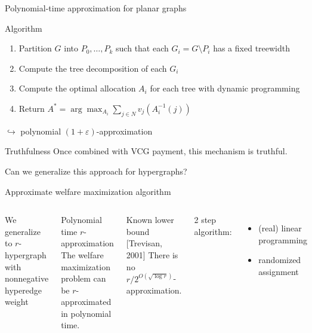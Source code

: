 \documentclass[aspectratio=169]{beamer}
\begin{document}
\begin{frame}{Polynomial-time approximation for planar graphs}
    \begin{block}{Algorithm}
        \begin{enumerate}
            \item \alert{Partition} $G$ into $P_0, \dots, P_k$ such that each $G_i = G \setminus P_i$ has a \alert{fixed treewidth}
            \item Compute the \alert{tree decomposition} of each $G_i$
            \item Compute the optimal allocation $A_i$ for each tree with \alert{dynamic programming}
            \item Return $A^* = \arg \max_{A_i} \sum_{j \in N} v_j(A_i^{-1}(j))$
        \end{enumerate}
    \end{block}

    $\hookrightarrow$ polynomial $(1 + \varepsilon)$-approximation

    \begin{block}{Truthfulness}
        Once combined with \alert{VCG payment}, this mechanism is \alert{truthful}.
    \end{block}
\end{frame}

\begin{frame}[standout]
    Can we generalize this approach for \alert{hypergraphs}?
\end{frame}

\begin{frame}{Approximate welfare maximization algorithm}
    \begin{columns}
        We generalize to \(r\)-hypergraph with \alert{nonnegative hyperedge weight}

        \begin{block}{Polynomial time \(r\)-approximation}
            The welfare maximization problem can be \(r\)-approximated in polynomial time.
        \end{block}

        \begin{block}{Known lower bound [Trevisan, 2001]}
            There is no \(r/2^{O(\sqrt{\log r})}\)-approximation.
        \end{block}

        2 step algorithm:
        \begin{itemize}
            \item (real) linear programming
            \item randomized assignment
        \end{itemize}
    \end{columns}
\end{frame}
\end{document}
